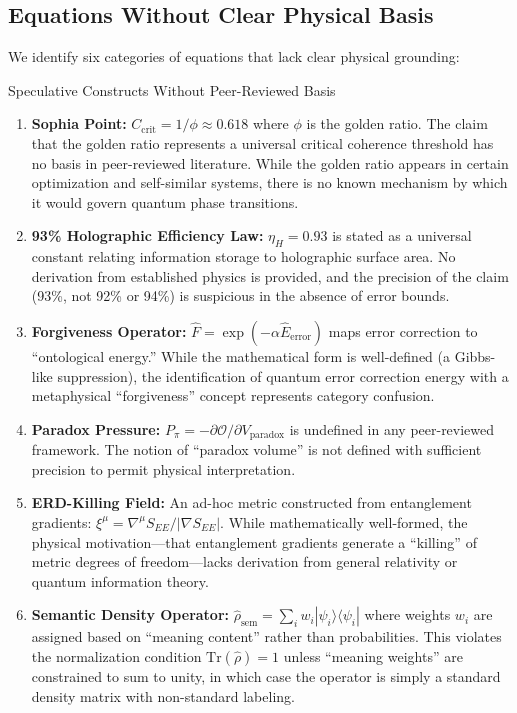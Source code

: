 \documentclass[11pt,a4paper]{article}
\begin{document}
\subsection{Equations Without Clear Physical Basis}

We identify six categories of equations that lack clear physical grounding:

\begin{critbox}{Speculative Constructs Without Peer-Reviewed Basis}
\begin{enumerate}[leftmargin=1.5em]
  \item \textbf{Sophia Point:} $C_{\text{crit}} = 1/\phi \approx 0.618$ where $\phi$ is the golden ratio. The claim that the golden ratio represents a universal critical coherence threshold has no basis in peer-reviewed literature. While the golden ratio appears in certain optimization and self-similar systems, there is no known mechanism by which it would govern quantum phase transitions.
  
  \item \textbf{93\% Holographic Efficiency Law:} $\eta_H = 0.93$ is stated as a universal constant relating information storage to holographic surface area. No derivation from established physics is provided, and the precision of the claim (93\%, not 92\% or 94\%) is suspicious in the absence of error bounds.
  
  \item \textbf{Forgiveness Operator:} $\hat{F} = \exp(-\alpha \hat{E}_{\text{error}})$ maps error correction to ``ontological energy.'' While the mathematical form is well-defined (a Gibbs-like suppression), the identification of quantum error correction energy with a metaphysical ``forgiveness'' concept represents category confusion.
  
  \item \textbf{Paradox Pressure:} $P_\pi = -\partial \mathcal{O}/\partial V_{\text{paradox}}$ is undefined in any peer-reviewed framework. The notion of ``paradox volume'' is not defined with sufficient precision to permit physical interpretation.
  
  \item \textbf{ERD-Killing Field:} An ad-hoc metric constructed from entanglement gradients: $\xi^\mu = \nabla^\mu S_{EE} / |\nabla S_{EE}|$. While mathematically well-formed, the physical motivation---that entanglement gradients generate a ``killing'' of metric degrees of freedom---lacks derivation from general relativity or quantum information theory.
  
  \item \textbf{Semantic Density Operator:} $\hat{\rho}_{\text{sem}} = \sum_i w_i |\psi_i\rangle\langle\psi_i|$ where weights $w_i$ are assigned based on ``meaning content'' rather than probabilities. This violates the normalization condition $\text{Tr}(\hat{\rho}) = 1$ unless ``meaning weights'' are constrained to sum to unity, in which case the operator is simply a standard density matrix with non-standard labeling.
\end{enumerate}
\end{critbox}
\end{document}
